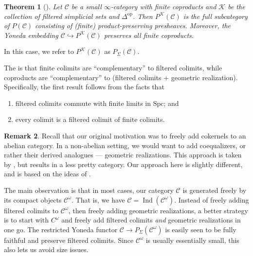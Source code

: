 \documentclass{shortart}
\newtheorem{thm}{Theorem}[section]
\theoremstyle{definition}
\newtheorem{remark}[thm]{Remark}
\newcommand\C{{\mathcal{C}}}
\newcommand\Spc{{\mathrm{Spc}}}
\newcommand\op{{\mathrm{op}}}
\DeclareMathOperator\Ind{Ind}
\begin{document}
\begin{thm}[{\cite[Lemma 5.5.8.14, Proposition 5.5.8.10]{htt}}]
  Let $\C$ be a small $\infty$-category with finite coproducts and $\mathcal{K}$ be the collection of filtered simplicial sets and $\Delta^\op$. Then $P^{\mathcal{K}}(\C)$ is the full subcategory of $P(\C)$ consisting of (finite) product-preserving presheaves. Moreover, the Yoneda embedding $\C \hookrightarrow P^{\mathcal{K}}(\C)$ preserves all finite coproducts.
\end{thm}
In this case, we refer to $P^{\mathcal{K}}(\C)$ as $P_\Sigma(\C)$.

The is that finite colimits are ``complementary'' to filtered colimits, while coproducts are ``complementary'' to (filtered colimits + geometric realization). Specifically, the first result follows from the facts that
\begin{enumerate}
  \item filtered colimits commute with finite limits in $\Spc$; and
  \item every colimit is a filtered colimit of finite colimits.
\end{enumerate}

\begin{remark}
  Recall that our original motivation was to freely add cokernels to an abelian category. In a non-abelian setting, we would want to add coequalizers, or rather their derived analogues --- geometric realizations. This approach is taken by \cite{algebraicity}, but results in a less pretty category. Our approach here is slightly different, and is based on the ideas of \cite[Section 6.4]{algebraicity}.

  The main observation is that in most cases, our category $\C$ is generated freely by its compact objects $\C^\omega$. That is, we have $\C = \Ind(\C^\omega)$. Instead of freely adding filtered colimits to $\C^\omega$, then freely adding geometric realizations, a better strategy is to start with $C^\omega$ and freely add filtered colimits \emph{and} geometric realizations in one go. The restricted Yoneda functor $\C \to P_\Sigma(\C^\omega)$ is easily seen to be fully faithful and preserve filtered colimits. Since $\C^\omega$ is usually essentially small, this also lets us avoid size issues.
\end{remark}
\end{document}
